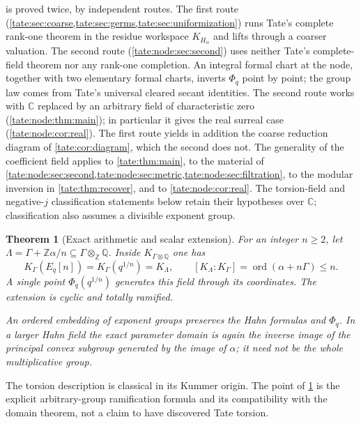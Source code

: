 \documentclass[11pt,letterpaper]{article}
\newtheorem{theorem}{Theorem}[section]
\theoremstyle{definition}
\newcommand{\C}{\mathbb C}
\newcommand{\Q}{\mathbb Q}
\newcommand{\Z}{\mathbb Z}
\newcommand{\ord}{\operatorname{ord}}
\begin{document}
 is proved twice, by independent routes.
The first route (\cref{tate:sec:coarse,tate:sec:germs,tate:sec:uniformization})
runs Tate's complete rank-one theorem in the residue workspace
$K_{H_\alpha}$ and lifts through a coarser valuation. The second route
(\cref{tate:node:sec:second}) uses neither Tate's complete-field theorem nor
any rank-one completion. An integral formal chart at the node, together with
two elementary formal charts, inverts $\Phi_q$ point by point; the group
law comes from Tate's universal cleared secant identities. The second route
works with $\C$ replaced by an arbitrary field of characteristic zero
(\cref{tate:node:thm:main}); in particular it gives the real surreal case
(\cref{tate:node:cor:real}). The first route yields in addition the coarse
reduction diagram of \cref{tate:cor:diagram}, which the second does not.
The generality of the coefficient field applies to
\cref{tate:thm:main}, to the material of
\cref{tate:node:sec:second,tate:node:sec:metric,tate:node:sec:filtration},
to the modular inversion in \cref{tate:thm:recover},
and to \cref{tate:node:cor:real}.
The torsion-field and negative-$j$ classification statements below retain
their hypotheses over $\C$; classification also assumes a divisible
exponent group.

\begin{theorem}[Exact arithmetic and scalar extension]\label{tate:thm:arithmetic-main}
For an integer $n\ge2$, let
$\Lambda=\Gamma+\Z\alpha/n\subseteq\Gamma\otimes_\Z\Q$.
Inside $K_{\Gamma\otimes\Q}$ one has
\begin{equation}
 K_\Gamma(E_q[n])=K_\Gamma(q^{1/n})=K_\Lambda,\qquad
 [K_\Lambda:K_\Gamma]=\ord(\alpha+n\Gamma)\le n.\label{tate:eq:torsion-main}
\end{equation}
A single point $\Phi_q(q^{1/n})$ generates this field through its
coordinates. The extension is cyclic and totally ramified.

An ordered embedding of exponent groups preserves the Hahn formulas and
$\Phi_q$. In a larger Hahn field the exact parameter domain is again the
inverse image of the principal convex subgroup generated by the image of
$\alpha$; it need not be the whole multiplicative group.
\end{theorem}

The torsion description is classical in its Kummer origin. The point of
\cref{tate:thm:arithmetic-main} is the explicit arbitrary-group ramification
formula and its compatibility with the domain theorem, not a claim to
have discovered Tate torsion.
\end{document}
